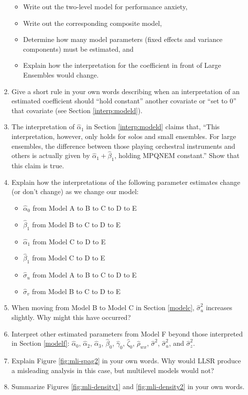 \documentclass[
]{krantz}
\providecommand{\tightlist}{%
  \setlength{\itemsep}{0pt}\setlength{\parskip}{0pt}}
\begin{document}
\begin{enumerate}
  \begin{itemize}
  \tightlist
  \item
    Write out the two-level model for performance anxiety,
  \item
    Write out the corresponding composite model,
  \item
    Determine how many model parameters (fixed effects and variance components) must be estimated, and
  \item
    Explain how the interpretation for the coefficient in front of Large Ensembles would change.
  \end{itemize}
\item
  Give a short rule in your own words describing when an interpretation of an estimated coefficient should ``hold constant'' another covariate or ``set to 0'' that covariate (see Section \ref{interp:modeld}).
\item
  The interpretation of \(\hat{\alpha}_{1}\) in Section \ref{interp:modeld} claims that, ``This interpretation, however, only holds for solos and small ensembles. For large ensembles, the difference between those playing orchestral instruments and others is actually given by \(\hat{\alpha}_{1}+\hat{\beta}_{1}\), holding MPQNEM constant.'' Show that this claim is true.
\item
  Explain how the interpretations of the following parameter estimates change (or don't change) as we change our model:

  \begin{itemize}
  \tightlist
  \item
    \(\hat{\alpha}_{0}\) from Model A to B to C to D to E
  \item
    \(\hat{\beta}_{1}\) from Model B to C to D to E
  \item
    \(\hat{\alpha}_{1}\) from Model C to D to E
  \item
    \(\hat{\beta}_{1}\) from Model C to D to E
  \item
    \(\hat{\sigma}_{u}\) from Model A to B to C to D to E
  \item
    \(\hat{\sigma}_{v}\) from Model B to C to D to E
  \end{itemize}
\item
  When moving from Model B to Model C in Section \ref{modelc}, \(\hat{\sigma}_{u}^{2}\) increases slightly. Why might this have occurred?
\item
  Interpret other estimated parameters from Model F beyond those interpreted in Section \ref{modelf}: \(\hat{\alpha}_{0}\), \(\hat{\alpha}_{2}\), \(\hat{\alpha}_{3}\), \(\hat{\beta}_{0}\), \(\hat{\gamma}_{0}\), \(\hat{\zeta}_{0}\), \(\hat{\rho}_{wx}\), \(\hat{\sigma}^{2}\), \(\hat{\sigma}_{u}^{2}\), and \(\hat{\sigma}_{z}^{2}\).
\item
  Explain Figure \ref{fig:mli-spag2} in your own words. Why would LLSR produce a misleading analysis in this case, but multilevel models would not?
\item
  Summarize Figures \ref{fig:mli-density1} and \ref{fig:mli-density2} in your own words.
\end{enumerate}
\end{document}
